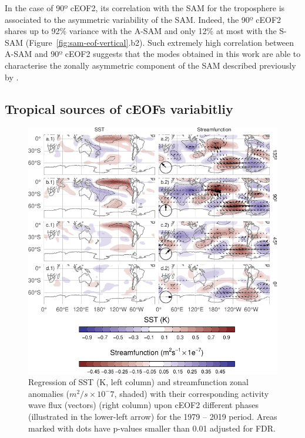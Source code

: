 \documentclass[pdflatex,lineno,sn-basic]{sn-jnl}
\theoremstyle{thmstyleone}%
\theoremstyle{thmstyletwo}%
\theoremstyle{thmstylethree}%
\begin{document}
In the case of 90º cEOF2, its correlation with the SAM for the troposphere is associated to the asymmetric variability of the SAM.
Indeed, the 90º cEOF2 shares up to 92\% variance with the A-SAM and only 12\% at most with the S-SAM (Figure~\ref{fig:sam-eof-vertical}.b2).
Such extremely high correlation between A-SAM and 90º cEOF2 suggests that the modes obtained in this work are able to characterise the zonally asymmetric component of the SAM described previously by \citet{campitelli2022}.

\hypertarget{tropical}{%
\subsection{Tropical sources of cEOFs variabitliy}\label{tropical}}

\begin{figure}
\includegraphics{shceof_files/figure-latex/sst-psi-2-1} \caption{Regression of SST (K, left column) and streamfunction zonal anomalies (\(m^2/s\times10^-7\), shaded) with their corresponding activity wave flux (vectors) (right column) upon cEOF2 different phases (illustrated in the lower-left arrow) for the 1979 -- 2019 period. Areas marked with dots have p-values smaller than 0.01 adjusted for FDR.}\label{fig:sst-psi-2}
\end{figure}
\end{document}
